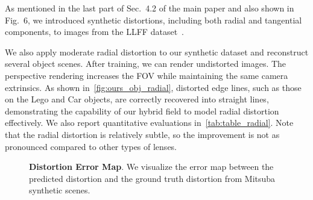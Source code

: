 \begin{table}[t]
  \centering
  \caption{\textbf{Evaluation on Radial Distortion of Mitsuba Synthetic Scenes}. We compare our method with 3DGS~\cite{kerbl20233d} in object-centric scenes with slight radial distortion, where our method still produces better reconstructions.}
  \label{tab:table_radial}
\end{table}

As mentioned in the last part of Sec.~4.2 of the main paper and also shown in Fig.~6, we introduced synthetic distortions, including both radial and tangential components, to images from the LLFF dataset~\cite{mildenhall2019llff}.

We also apply moderate radial distortion to our synthetic dataset and reconstruct several object scenes. After training, we can render undistorted images. The perspective rendering increases the FOV while maintaining the same camera extrinsics. As shown in~\cref{fig:ours_obj_radial}, distorted edge lines, such as those on the Lego and Car objects, are correctly recovered into straight lines, demonstrating the capability of our hybrid field to model radial distortion effectively. We also report quantitative evaluations in~\cref{tab:table_radial}. Note that the radial distortion is relatively subtle, so the improvement is not as pronounced compared to other types of lenses.



\begin{figure}[t] %
    \centering
    \caption{\textbf{Distortion Error Map}. We visualize the error map between the predicted distortion and the ground truth distortion from Mitsuba synthetic scenes.} %
    \label{fig:error_map} %
\end{figure}

